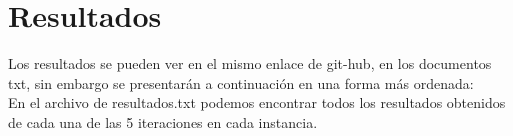 \documentclass[12pt,a4paper]{article}
\begin{document}
\section{Resultados} 
Los resultados se pueden ver en el mismo enlace de git-hub, en los documentos txt, sin embargo se presentarán a continuación en una forma más ordenada:
\\ En el archivo de resultados.txt podemos encontrar todos los resultados obtenidos de cada una de las 5 iteraciones en cada instancia. 
\begin{table}[h!]
    \centering
    \end{table}
\end{document}

